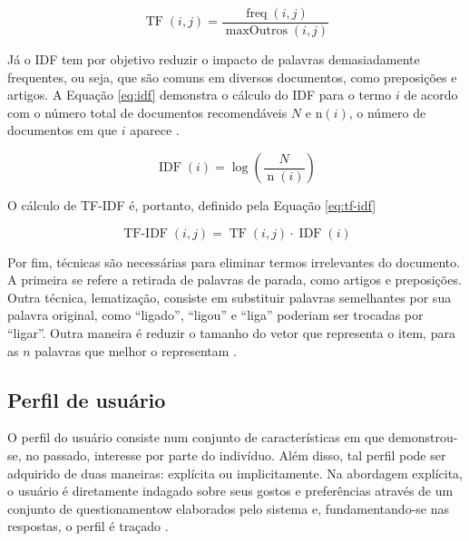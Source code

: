    \begin{equation}
        \operatorname{TF}(i,j) = \frac{\operatorname{freq}(i,j)}{\operatorname{maxOutros}(i,j)} \label{eq:tf}
    \end{equation}
    
    Já o IDF tem por objetivo reduzir o impacto de palavras demasiadamente frequentes, ou seja, que são comuns em diversos documentos, como preposições e artigos. A Equação \ref{eq:idf} demonstra o cálculo do IDF para o termo $i$ de acordo com o número total de documentos recomendáveis $N$ e $\mathrm{n}(i)$, o número de documentos em que $i$ aparece \cite{Jannach2010}.
    
    \begin{equation}
        \operatorname{IDF}(i) = \log\left(\frac{N}{\operatorname{n}(i)}\right) \label{eq:idf}
    \end{equation}
        
    O cálculo de TF-IDF é, portanto, definido pela Equação \ref{eq:tf-idf}
    
    \begin{equation}
        \operatorname{TF-IDF}(i,j) = \operatorname{TF}(i, j)\cdot \operatorname{IDF}(i) \label{eq:tf-idf}
    \end{equation}

    
    Por fim, técnicas são necessárias para eliminar termos irrelevantes do documento. A primeira se refere a retirada de palavras de parada, como artigos e preposições. Outra técnica, lematização, consiste em substituir palavras semelhantes por sua palavra original, como ``ligado'', ``ligou'' e ``liga'' poderiam ser trocadas por ``ligar''. Outra maneira é reduzir o tamanho do vetor que representa o item, para as $n$ palavras que melhor o representam \cite{Jannach2010}.
    
     
    \subsection{Perfil de usuário}
    
    O perfil do usuário consiste num conjunto de características em que demonstrou-se, no passado, interesse por parte do indivíduo. Além disso, tal perfil pode ser adquirido de duas maneiras: explícita ou implicitamente. Na abordagem explícita, o usuário é diretamente indagado sobre seus gostos e preferências através de um conjunto de questionamentow elaborados pelo sistema e, fundamentando-se nas respostas, o perfil é traçado \cite{Adomavicius2005}.
    
